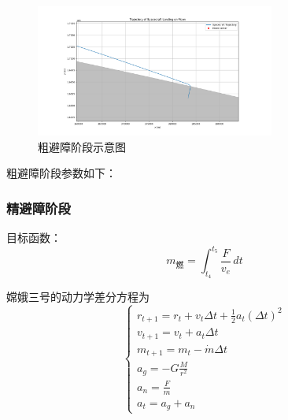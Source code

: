 \documentclass{ctexart}
\begin{document}
    \begin{figure}[H] %
        \centering %
        \includegraphics[width=0.7\textwidth]{"./picture/stage3_2.png"} %
        \caption{粗避障阶段示意图} %
        \label{fig:example} %
    \end{figure}
粗避障阶段参数如下：
\begin{center}
\end{center}
\subsubsection{精避障阶段}

目标函数：
\begin{equation}
m_{\text{燃}} = \int_{t_4}^{t_5} \frac{F}{v_e} \, dt
\end{equation}

嫦娥三号的动力学差分方程为
\[
\begin{cases}
r_{t+1} = r_t + v_t \Delta t + \frac{1}{2} a_t (\Delta t)^2 \\
v_{t+1} = v_t + a_t \Delta t \\
m_{t+1} = m_t - \dot{m} \Delta t \\
a_g = - G \frac{M}{r^2} \\
a_n = \frac{F}{m} \\
a_t = a_g + a_n
\end{cases}
\]
\end{document}
